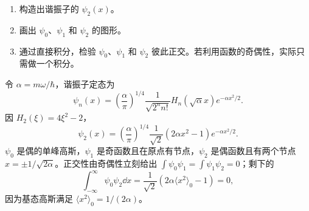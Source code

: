 \begin{question}
\begin{enumerate}
\item 构造出谐振子的 $\psi_2(x)$。
\item 画出 $\psi_0$、$\psi_1$ 和 $\psi_2$ 的图形。
\item 通过直接积分，检验 $\psi_0$、$\psi_1$ 和 $\psi_2$ 彼此正交。若利用函数的奇偶性，实际只需做一个积分。
\end{enumerate}
\end{question}
\begin{solution}
令 $\alpha=m\omega/\hbar$，谐振子定态为
\[
\psi_n(x)=\left(\frac{\alpha}{\pi}\right)^{1/4}\frac{1}{\sqrt{2^n n!}}H_n(\sqrt\alpha x)e^{-\alpha x^2/2}.
\]
因 $H_2(\xi)=4\xi^2-2$，
\[
\psi_2(x)=\left(\frac{\alpha}{\pi}\right)^{1/4}\frac1{\sqrt2}(2\alpha x^2-1)e^{-\alpha x^2/2}.
\]
$\psi_0$ 是偶的单峰高斯，$\psi_1$ 是奇函数且在原点有节点，$\psi_2$ 是偶函数且有两个节点 $x=\pm1/\sqrt{2\alpha}$。正交性由奇偶性立刻给出 $\int\psi_0\psi_1=\int\psi_1\psi_2=0$；剩下的
\[
\int_{-\infty}^{\infty}\psi_0\psi_2\dd x
=\frac1{\sqrt2}\left(2\alpha\langle x^2\rangle_0-1\right)=0,
\]
因为基态高斯满足 $\langle x^2\rangle_0=1/(2\alpha)$。
\end{solution}

